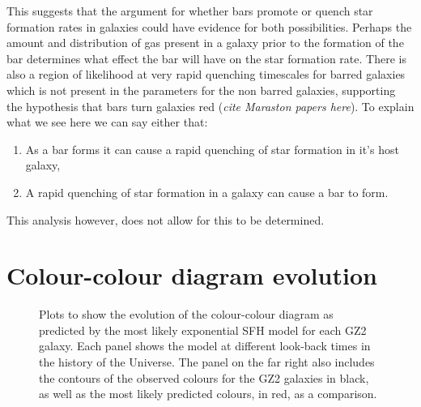 \documentclass{mn2e}
\begin{document}
This suggests that the argument for whether bars promote or quench star formation rates in galaxies could have evidence for both possibilities. Perhaps the amount and distribution of gas present in a galaxy prior to the formation of the bar determines what effect the bar will have on the star formation rate. There is also a region of likelihood at very rapid quenching timescales for barred galaxies which is not present in the parameters for the non barred galaxies, supporting the hypothesis that bars turn galaxies red (\emph{cite Maraston papers here}). To explain what we see here we can say either that:
\begin{enumerate}
\item As a bar forms it can cause a rapid quenching of star formation in it's host galaxy,
\item A rapid quenching of star formation in a galaxy can cause a bar to form.
\end{enumerate}
This analysis however, does not allow for this to be determined. 

\section{Colour-colour diagram evolution}
\begin{figure}
\caption{Plots to show the evolution of the colour-colour diagram as predicted by the most likely exponential SFH model for each GZ2 galaxy. Each panel shows the model at different look-back times in the history of the Universe. The panel on the far right also includes the contours of the observed colours for the GZ2 galaxies in black, as well as the most likely predicted colours, in red, as a comparison.}
\label{c_c_evo}
\end{figure}
\end{document}
